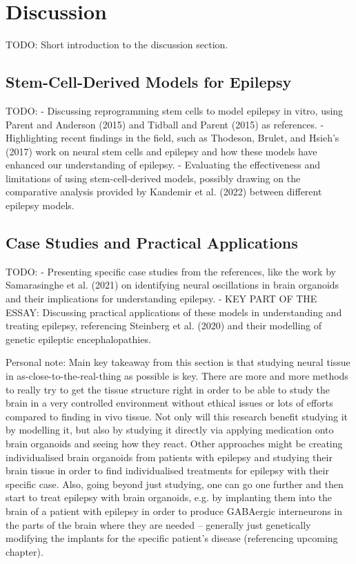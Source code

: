\documentclass[10pt]{article}
\begin{document}
\begin{sloppypar}
  \section{Discussion}
  \label{sec:discussion}

  TODO: Short introduction to the discussion section.

  \subsection{Stem-Cell-Derived Models for Epilepsy}
  \label{sec:stem-cell-derived-models-for-epilepsy}

  TODO:
  - Discussing reprogramming stem cells to model epilepsy in vitro, using Parent and Anderson (2015) and Tidball and Parent (2015) as references.
  - Highlighting recent findings in the field, such as Thodeson, Brulet, and Hsieh's (2017) work on neural stem cells and epilepsy and how these models have enhanced our understanding of epilepsy.
  - Evaluating the effectiveness and limitations of using stem-cell-derived models, possibly drawing on the comparative analysis provided by Kandemir et al. (2022) between different epilepsy models.

  \subsection{Case Studies and Practical Applications}
  \label{sec:case-studies-and-practical-applications}

  TODO:
  - Presenting specific case studies from the references, like the work by Samarasinghe et al. (2021) on identifying neural oscillations in brain organoids and their implications for understanding epilepsy.
  - KEY PART OF THE ESSAY: Discussing practical applications of these models in understanding and treating epilepsy, referencing Steinberg et al. (2020) and their modelling of genetic epileptic encephalopathies.

  Personal note: Main key takeaway from this section is that studying neural tissue in as-close-to-the-real-thing as possible is key. There are more and more methods to really try to get the tissue structure right in order to be able to study the brain in a very controlled environment without ethical issues or lots of efforts compared to finding in vivo tissue. Not only will this research benefit studying it by modelling it, but also by studying it directly via applying medication onto brain organoids and seeing how they react. Other approaches might be creating individualised brain organoids from patients with epilepsy and studying their brain tissue in order to find individualised treatments for epilepsy with their specific case. Also, going beyond just studying, one can go one further and then start to treat epilepsy with brain organoids, e.g. by implanting them into the brain of a patient with epilepsy in order to produce GABAergic interneurons in the parts of the brain where they are needed – generally just genetically modifying the implants for the specific patient's disease (referencing upcoming chapter).


\end{sloppypar}
\end{document}
